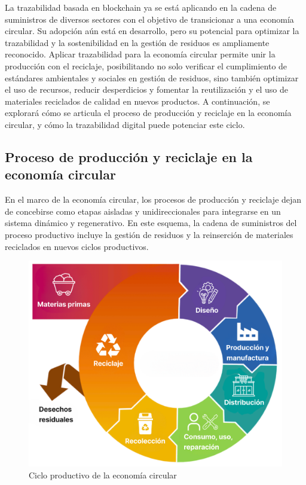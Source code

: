 La trazabilidad basada en blockchain ya se está aplicando en la cadena de suministros de diversos sectores con el objetivo de transicionar a una economía circular. Su adopción aún está en desarrollo, pero su potencial para optimizar la trazabilidad y la sostenibilidad en la gestión de residuos es ampliamente reconocido. Aplicar trazabilidad para la economía circular permite unir la producción con el reciclaje, posibilitando no solo verificar el cumplimiento de estándares ambientales y sociales en gestión de residuos, sino también optimizar el uso de recursos, reducir desperdicios y fomentar la reutilización y el uso de materiales reciclados de calidad en nuevos productos. A continuación, se explorará cómo se articula el proceso de producción y reciclaje en la economía circular, y cómo la trazabilidad digital puede potenciar este ciclo.

\subsection{Proceso de producción y reciclaje en la economía circular}

En el marco de la economía circular, los procesos de producción y reciclaje dejan de concebirse como etapas aisladas y unidireccionales para integrarse en un sistema dinámico y regenerativo. En este esquema, la cadena de suministros del proceso productivo incluye la gestión de residuos y la reinserción de materiales reciclados en nuevos ciclos productivos. 

\begin{figure}[!tb]
    \centering
    \includegraphics[width=1\textwidth]{Figures/circular-economy-stages.png}
    \caption{Ciclo productivo de la economía circular}
    \label{fig:circular-economy-stages}
\end{figure}

